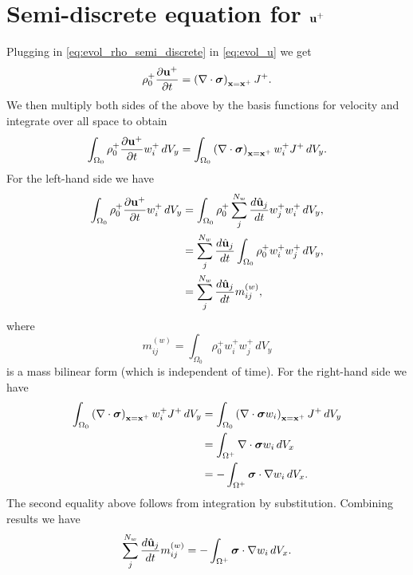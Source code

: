 \documentclass[11pt]{article}
\begin{document}
\section{Semi-discrete equation for $\mathbf{u}^+$}
Plugging in \cref{eq:evol_rho_semi_discrete} in \cref{eq:evol_u} we get
\begin{equation}
    \rho^+_0 \frac{\partial \mathbf{u}^+}{\partial t} = \left ( \nabla \cdot \bm \sigma \right )_{\mathbf{x} = \mathbf{x}^+} J^+.
\end{equation}
We then multiply both sides of the above by the basis functions for velocity and integrate over all space to obtain
\begin{equation}
    \int_{\Omega_0} \rho^+_0 \frac{\partial \mathbf{u}^+}{\partial t} w^+_i \, dV_y = \int_{\Omega_0} \left ( \nabla \cdot \bm \sigma \right )_{\mathbf{x} = \mathbf{x}^+} w^+_i J^+ \, dV_y.
\end{equation}
For the left-hand side we have
\begin{align}
    \int_{\Omega_0} \rho^+_0 \frac{\partial \mathbf{u}^+}{\partial t} w^+_i \, dV_y &= \int_{\Omega_0} \rho^+_0 \sum_j^{N_w} \frac{d \hat{\mathbf{u}}_j}{dt} w^+_j w^+_i \, dV_y, \nonumber \\
    &= \sum_j^{N_w} \frac{d \hat{\mathbf{u}}_j}{dt} \int_{\Omega_0} \rho^+_0 w^+_i w^+_j \, dV_y, \nonumber \\
    &= \sum_j^{N_w} \frac{d \hat{\mathbf{u}}_j}{dt} m_{ij}^{(w)},
\end{align}
where
\begin{equation}
    m_{ij}^{(w)} = \int_{\Omega_0} \rho^+_0 w^+_i w^+_j \, dV_y
\end{equation}
is a mass bilinear form (which is independent of time). For the right-hand side we have
\begin{align}
    \int_{\Omega_0} \left ( \nabla \cdot \bm \sigma \right )_{\mathbf{x} = \mathbf{x}^+} w^+_i J^+ \, dV_y & = \int_{\Omega_0} \left ( \nabla \cdot \bm \sigma w_i \right )_{\mathbf{x} = \mathbf{x}^+} J^+ \, dV_y \nonumber \\
    & = \int_{\Omega^+} \nabla \cdot \bm \sigma w_i \, dV_x \nonumber \\
    & = -\int_{\Omega^+} \bm \sigma \cdot \nabla w_i \, dV_x.
\end{align}
The second equality above follows from integration by substitution. Combining results we have
\begin{equation}
    \label{eq:evol_u_semi_discrete}
    \sum_j^{N_w} \frac{d \hat{\mathbf{u}}_j}{d t} m^{(w)}_{ij} = -\int_{\Omega^+} \bm \sigma \cdot \nabla w_i \, dV_x.
\end{equation}
\end{document}
